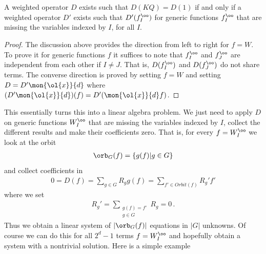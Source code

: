 \begin{lemma}A weighted operator $D$ exists such that $D( KQ) = D(1)$ if and only if a weighted operator $D'$ exists such that $D'(f_I^\oo)$ for generic functions $f_I^\oo$ that are missing the variables indexed by $I$, for all $I$.
\end{lemma}
\begin{proof} The discussion above provides the direction from left to right for $f = W$. To prove it for generic functions $f$ it suffices to note that $f_I^\oo$ and $f_J^\oo$ are independent from each other if $I \neq J$. That is, $D(f_I^\oo)$ and $D(f_J^\oo)$ do not share terms. The converse direction is proved by setting $f = W$ and setting $D = D'\mon{\ol{x}}{d}$ where $(D'\mon{\ol{x}}{d} )(f) = D'(\mon{\ol{x}}{d} f)$.
\end{proof}
This essentially turns this into a linear algebra problem. We just need to apply $D$ on generic functions $W_I^\oo$ that are missing the variables indexed by $I$, collect the different results and make their coefficients zero. That is, for every $f = W_I^\oo$ we look at the orbit
\begin{align}
	\orb_G(f) = \{g(f)| g \in G\}
\end{align}
and collect coefficients in
\begin{align}
	0 = D(f) = \sum_{g\in G}R_g g(f) = \sum_{f' \in Orbit(f)} R_g' f'
\end{align}
where we set
\begin{align}
	R_g' = \sum_{\substack{g(f) = f'\\g\in G}} R_g = 0\,.
\end{align}
Thus we obtain a linear system of $|\orb_G(f)|$ equations in $|G|$ unknowns. Of course we can do this for all $2^d - 1$ terms $f = W_I^\oo$ and hopefully obtain a system with a nontrivial solution. Here is a simple example
